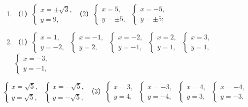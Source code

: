 \begin{enumerate}
\item
  （1）\(\left\{ \begin{array}{l} x = \pm \sqrt{3}, \\ y = 9, \end{array} \right.\)（2）\(\left\{ \begin{array}{l} x = 5, \\ y = \pm 5, \end{array} \right.\) \(\left\{ \begin{array}{l} x = -5, \\ y = \pm 5; \end{array} \right.\)
\item
  （1）\(\left\{ \begin{array}{l} x = 1, \\ y = -2, \end{array} \right.\) \(\left\{ \begin{array}{l} x = -1, \\ y = 2, \end{array} \right.\) \(\left\{ \begin{array}{l} x = -2, \\ y = -1, \end{array} \right.\) \(\left\{ \begin{array}{l} x = 2, \\ y = 1, \end{array} \right.\) \(\left\{ \begin{array}{l} x = 3, \\ y = 1, \end{array} \right.\) \(\left\{ \begin{array}{l} x = -3, \\ y = -1, \end{array} \right.\)
\end{enumerate}

\(\left\{ \begin{array}{l} x = \sqrt{5}, \\ y = \sqrt{5}, \end{array} \right.\) \(\left\{ \begin{array}{l} x = -\sqrt{5}, \\ y = -\sqrt{5}, \end{array} \right.\)（3）\(\left\{ \begin{array}{l} x = 3, \\ y = 4, \end{array} \right.\) \(\left\{ \begin{array}{l} x = -3, \\ y = -4, \end{array} \right.\) \(\left\{ \begin{array}{l} x = 4, \\ y = 3, \end{array} \right.\) \(\left\{ \begin{array}{l} x = -4, \\ y = -3, \end{array} \right.\)

